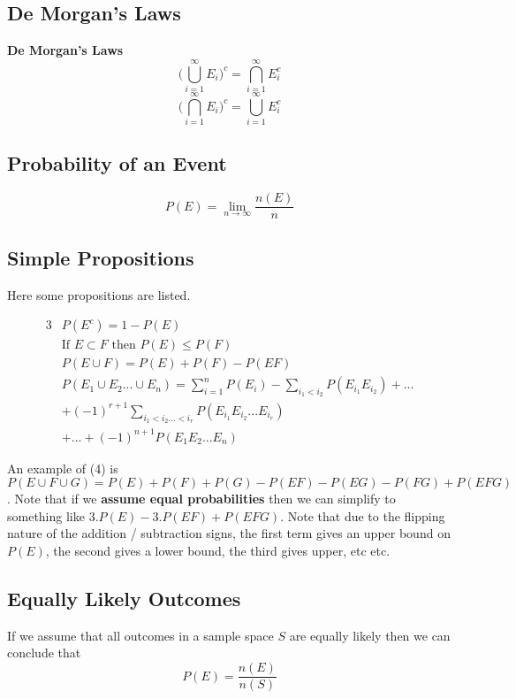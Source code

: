 \documentclass[10pt,a4paper]{article}
\begin{document}
    \subsection{De Morgan's Laws}
    \begin{framed}
    \centering\textbf{De Morgan's Laws}
    $$ \Bigg( \bigcup_{i=1}^{\infty} E_i\Bigg)^c = \bigcap_{i=1}^{\infty} E_i^c  $$ $$\Bigg( \bigcap_{i=1}^{\infty} E_i\Bigg)^c = \bigcup_{i=1}^{\infty} E_i^c$$
    \end{framed}
    \subsection{Probability of an Event}
    \begin{framed}
        $$P(E) = \lim_{n \to \infty} \frac{n(E)}{n} $$ 
    \end{framed}
    \newpage
    \subsection{Simple Propositions}
    Here some propositions are listed. 
    \begin{framed}
        \begin{alignat}{3}
            &P(E^c) = 1 - P(E)  \\
            &\text{If } E \subset F  \text{ then }  P(E) \leq P(F)   \\
            &P(E \cup F) = P(E) + P(F) - P(EF) \\
            &P(E_1 \cup E_2 ... \cup E_n) = \sum_{i=1}^n P(E_i) - \sum_{i_1 < i_2} P(E_{i_1}E_{i_2}) + ... \\
            \nonumber  &+(-1)^{r+1} \sum_{i_1 < i_2 ... < i_r} P(E_{i_1} E_{i_2}...E_{i_r}) \\
            \nonumber &+...+ (-1)^{n+1}P(E_1 E_2 ... E_n)
        \end{alignat}  
    \end{framed}            
    An example of (4) is $P(E \cup F \cup G) = P(E) + P(F) +P(G) - P(EF) - P(EG) - P(FG) + P(EFG)$. Note that if we \textbf{assume equal probabilities} then we can simplify to something like $3.P(E) - 3.P(EF) + P(EFG)$. Note that due to the flipping nature of the addition / subtraction signs, the first term gives an upper bound on $P(E)$, the second gives a lower bound, the third gives upper, etc etc.
    \subsection{Equally Likely Outcomes}
    If we assume that all outcomes in a sample space $S$ are equally likely then we can conclude that $$P(E) = \frac{n(E)}{n(S)}$$
    \newpage
\end{document}
